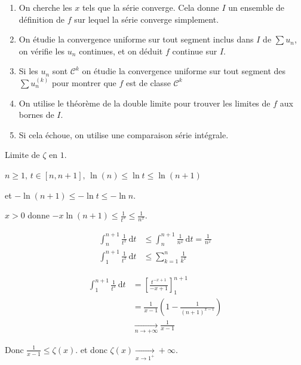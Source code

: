 \begin{enumerate}
    \item On cherche les $x$ tels que la série converge. Cela donne $I$ un ensemble de définition 
    de $f$ sur lequel la série converge simplement.
    \item On étudie la convergence uniforme sur tout segment inclus dans $I$ de $\sum u_n$, on vérifie 
    les $u_n$ continues, et on déduit $f$ continue sur $I$.
    \item Si les $u_n$ sont $\mathscr C^k$ on étudie la convergence uniforme sur tout segment des 
    $\sum u_n^{(k)}$ pour montrer que $f$ est de classe $\mathscr{C}^k$ 
    \item On utilise le théorème de la double limite pour trouver les limites de $f$ aux bornes 
    de $I$. 
    \item Si cela échoue, on utilise une comparaison série intégrale. 
\end{enumerate}

\begin{exemple}
    Limite de $\zeta$ en $1$.

    $n \geqslant 1, \, t \in [n, n+ 1], \, \ln(n) \leqslant \ln t \leqslant \ln (n+ 1)$
    
    et $-\ln(n + 1) \leqslant - \ln t \leqslant - \ln n$.

    $x > 0$ donne $- x \ln(n + 1) \leqslant \frac 1 {t^x} \leqslant \frac 1 {n^x}$.

    \begin{align}
        \int_n^{n + 1} \frac 1 {t^x} \,\mathrm{d}t & \leqslant \int_n^{n + 1} \frac 1 {n^x} \,\mathrm{d}t = \frac 1 {n^x} \\
        \int_1^{n + 1} \frac 1 {t^x} \, \mathrm{d}t & \leqslant \sum_{k = 1 }^{n } \frac 1 {k^x} 
    \end{align}

    \begin{align}
        \int_{1 }^{n + 1 } \frac 1 {t^x} \, \mathrm{d}t &  = \left[ \frac{t^{- x + 1}}{- x + 1} \right]_{1}^{n + 1} \\
        & = \frac{1 }{x - 1} \left( 1 - \frac 1 {(n + 1)^{x - 1}} \right)\\
        & \xrightarrow[n \to + \infty]{} \frac 1 {x - 1}
    \end{align} 

    Donc $\frac 1 {x - 1} \leqslant \zeta(x)$. et donc $\zeta(x) \xrightarrow[x \to 1^+]{} + \infty$.
\end{exemple}


